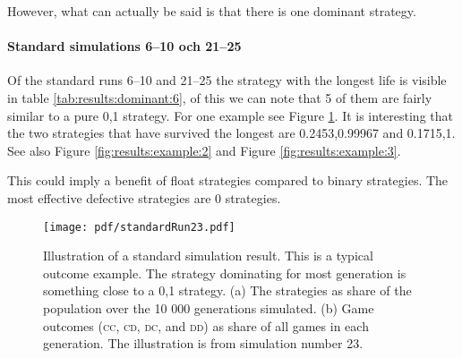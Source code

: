 
However, what can actually be said is that there is one dominant strategy.

\paragraph{Standard simulations 6--10 och 21--25}
Of the standard runs 6--10 and 21--25 the strategy with the longest life is visible in table \ref{tab:results:dominant:6}, of this we can note that 5 of them are fairly similar to a pure 0,1 strategy. For one example see Figure \ref{fig:results:example:1}. It is interesting that the two strategies that have survived the longest are 0.2453,0.99967 and 0.1715,1. See also Figure \ref{fig:results:example:2}  and Figure \ref{fig:results:example:3}.

This could imply a benefit of float strategies compared to binary strategies. The most effective defective strategies are 0 strategies.


\begin{figure}[htbp]
\centering
\texttt{[image: pdf/standardRun23.pdf]}
\caption{Illustration of a standard simulation result. This is a
  typical outcome example. The strategy dominating for most generation
  is something close to a 0,1 strategy. (a) The strategies as share of
  the population over the 10 000 generations simulated. (b) Game
  outcomes (\textsc{cc}, \textsc{cd}, \textsc{dc}, and
  \textsc{dd}) as share of all games in each generation. The
  illustration is from simulation number 23.  }
\label{fig:results:example:1}
\end{figure}

